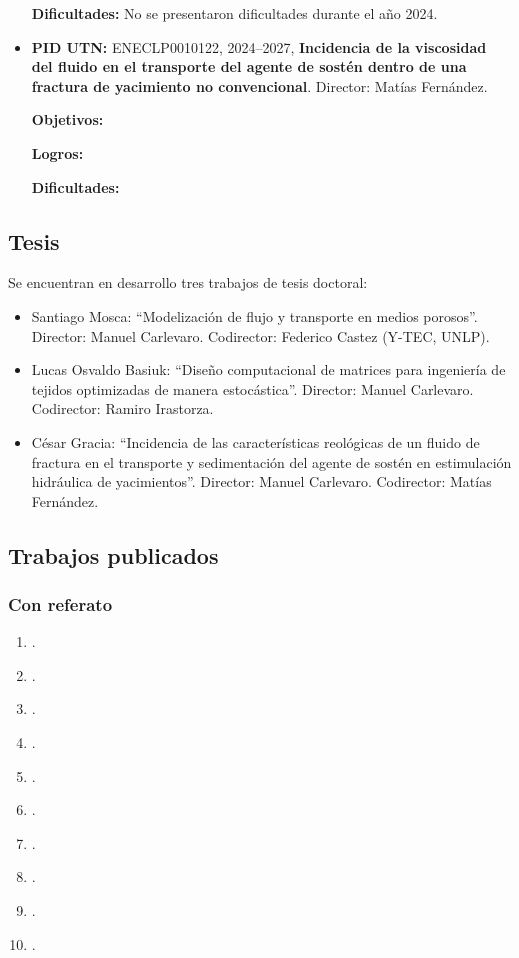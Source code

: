 \documentclass[a4paper,11pt,twoside,final,titlepage,onecolumn,openright]{report}
\begin{document}
\begin{itemize}
    \textbf{Dificultades:} No se presentaron dificultades durante el año 2024.

  \item \textbf{PID UTN:} ENECLP0010122, 2024--2027, \textbf{Incidencia de la viscosidad del fluido en el transporte del agente de sostén dentro de una fractura de yacimiento no convencional}. Director: Matías Fernández.

    \textbf{Objetivos:} \color{red}{COMPLETAR.}

    \textbf{Logros:}  \color{red}{COMPLETAR.}

    \textbf{Dificultades:}  \color{red}{COMPLETAR.}




\end{itemize}

\subsection{Tesis}

Se encuentran en desarrollo tres trabajos de tesis doctoral:
\begin{itemize}
 \item Santiago Mosca: ``Modelización de flujo y transporte en medios porosos''. Director: Manuel Carlevaro. Codirector: Federico Castez (Y-TEC, UNLP).
 \item Lucas Osvaldo Basiuk: ``Diseño computacional de matrices para ingeniería de tejidos optimizadas de manera estocástica''. Director: Manuel Carlevaro. Codirector: Ramiro Irastorza.
\item César Gracia: ``Incidencia de las características reológicas de un fluido de fractura en el transporte y sedimentación del agente de sostén en estimulación hidráulica de yacimientos''. Director: Manuel Carlevaro. Codirector: Matías Fernández.
\end{itemize}

\subsection{Trabajos publicados}

\subsubsection{Con referato}

\begin{enumerate}
    \item {}.
    \item {}.
    \item {}.
    \item {}.
    \item {}.
    \item {}.
    \item {}.
    \item {}.
    \item {}.
    \item {}.
\end{enumerate}
\end{document}

